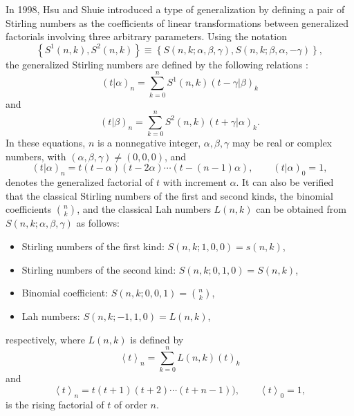 \documentclass[12pt]{article}
\begin{document}
In 1998, Hsu and Shuie \cite{Hsu} introduced a type of generalization by defining a pair of Stirling numbers as the coefficients of linear transformations between generalized factorials involving three arbitrary parameters. Using the notation 
\begin{equation*}
	\left\{S^1(n,k),S^2(n,k)\right\}\equiv
	\left\{S(n,k;\alpha,\beta,\gamma),S(n,k;\beta,\alpha,-\gamma)\right\},
\end{equation*}
the generalized Stirling numbers are defined by the following relations \cite[Equations (1) and (2)]{Hsu}:
\begin{equation}
	(t|\alpha)_n=\sum_{k=0}^{n}S^1(n,k)(t-\gamma|\beta)_k\label{Hsu1}
\end{equation}
and
\begin{equation}
	(t|\beta)_n=\sum_{k=0}^{n}S^2(n,k)(t+\gamma|\alpha)_k.\label{Hsu2}
\end{equation}	
In these equations, $n$ is a nonnegative integer, $\alpha,\beta,\gamma$ may be real or complex numbers, with $(\alpha,\beta,\gamma)\neq(0,0,0)$, and 
\begin{equation}
	(t|\alpha)_n=t(t-\alpha)(t-2\alpha)\cdots(t-(n-1)\alpha),\qquad (t|\alpha)_0=1,
\end{equation}
denotes the generalized factorial of $t$ with increment $\alpha$. It can also be verified that the classical Stirling numbers of the first and second kinds, the binomial coefficients $\binom{n}{k}$, and the classical Lah numbers $L(n,k)$ can be obtained from $S(n,k;\alpha,\beta,\gamma)$ as follows:
\begin{itemize}
	\item Stirling numbers of the first kind: $S(n,k;1,0,0)=s(n,k)$, 
	\item Stirling numbers of the second kind: $S(n,k;0,1,0)=S(n,k)$,
	\item Binomial coefficient: $S(n,k;0,0,1)=\binom{n}{k}$,
	\item Lah numbers: $S(n,k;-1,1,0)=L(n,k)$,
\end{itemize}
respectively, where $L(n,k)$ is defined by
\begin{equation}
	\left\langle t\right\rangle_n=\sum_{k=0}^{n}L(n,k)(t)_k
\end{equation}
and
\begin{equation*}
	\left\langle t\right\rangle_n=t(t+1)(t+2)\cdots(t+n-1)),\qquad \left\langle t\right\rangle_0=1,
\end{equation*}
is the rising factorial of $t$ of order $n$. 
\end{document}
